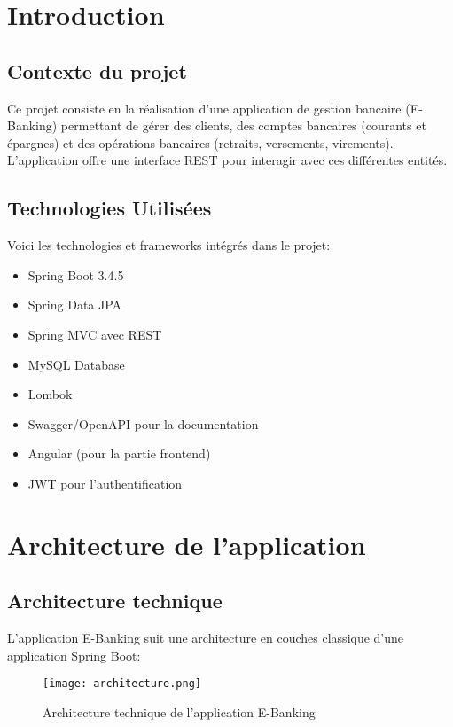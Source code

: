 \documentclass[12pt,a4paper]{report}
\begin{document}





\tableofcontents
\thispagestyle{empty}
\newpage

\chapter*{Introduction}
\section{Contexte du projet}
Ce projet consiste en la réalisation d'une application de gestion bancaire (E-Banking) permettant de gérer des clients, des comptes bancaires (courants et épargnes) et des opérations bancaires (retraits, versements, virements). L'application offre une interface REST pour interagir avec ces différentes entités.

\section{Technologies Utilisées}
Voici les technologies et frameworks intégrés dans le projet:
\begin{itemize}
    \item Spring Boot 3.4.5
    \item Spring Data JPA
    \item Spring MVC avec REST
    \item MySQL Database
    \item Lombok
    \item Swagger/OpenAPI pour la documentation
    \item Angular (pour la partie frontend)
    \item JWT pour l'authentification
\end{itemize}

\chapter{Architecture de l'application}
\section{Architecture technique}
L'application E-Banking suit une architecture en couches classique d'une application Spring Boot:

\begin{figure}[H]
    \centering
    \texttt{[image: architecture.png]}
    \caption{Architecture technique de l'application E-Banking}
    \label{fig:architecture}
\end{figure}
\end{document}
